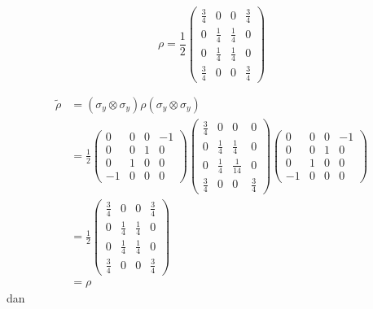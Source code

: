 \begin{equation}
	\rho = \frac{1}{2}
	\begin{pmatrix}
		\frac{3}{4}&0&0&\frac{3}{4}\\
		0&\frac{1}{4}&\frac{1}{4}&0\\
		0&\frac{1}{4}&\frac{1}{4}&0\\
		\frac{3}{4}&0&0&\frac{3}{4}
	\end{pmatrix}
\end{equation}

\begin{equation}
	\begin{aligned}
		\tilde{\rho} 
		&= (\sigma_y \otimes \sigma_y) \rho (\sigma_y \otimes \sigma_y)\\
		&= \frac{1}{2}
		\begin{pmatrix}
			0 & 0 & 0 & -1 \\
			0 & 0 & 1 & 0 \\
			0 & 1 & 0 & 0 \\
			-1 & 0 & 0 & 0
		\end{pmatrix}
		\begin{pmatrix}
			\frac{3}{4} & 0 & 0 & 0 \\
			0 & \frac{1}{4} & \frac{1}{4} & 0 \\
			0 & \frac{1}{4} & \frac{1}{14} & 0 \\
			\frac{3}{4} & 0 & 0 & \frac{3}{4}
		\end{pmatrix}
		\begin{pmatrix}
			0 & 0 & 0 & -1 \\
			0 & 0 & 1 & 0 \\
			0 & 1 & 0 & 0 \\
			-1 & 0 & 0 & 0
		\end{pmatrix}\\
		&= \frac{1}{2}
		\begin{pmatrix}
			\frac{3}{4}&0&0&\frac{3}{4}\\
			0&\frac{1}{4}&\frac{1}{4}&0\\
			0&\frac{1}{4}&\frac{1}{4}&0\\
			\frac{3}{4}&0&0&\frac{3}{4}
		\end{pmatrix}\\
		&=\rho
	\end{aligned}
\end{equation}
dan

